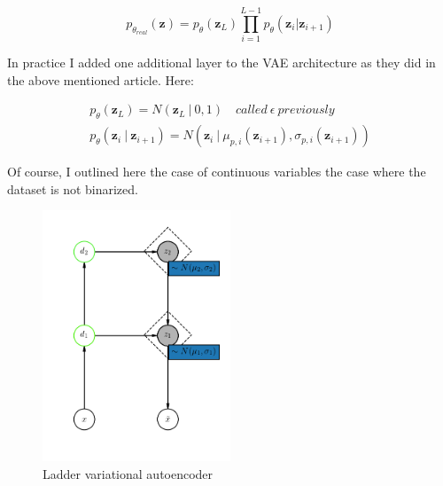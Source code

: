 \documentclass[11pt, english]{article}
\begin{document}
\vspace{3mm}

\begin{equation}
    p_{\theta_{real}}(\bm{z}) =  p_{\theta}(\bm{z}_{L})\prod_{i = 1}^{L - 1}p_{\theta}(\bm{z}_i | \bm{z}_{i+1})
\end{equation}

\vspace{3mm}

\par In practice I added one additional layer to the VAE architecture as they did in the above mentioned article. Here:

\vspace{3mm}

\begin{gather*}
    p_{\theta}(\bm{z}_L) = N(\bm{z}_L  ~ | ~ 0, 1) \quad called\ \epsilon\ previously\\
    p_{\theta}(\bm{z}_i ~ | ~ \bm{z}_{i+1}) = N(\bm{z}_i ~ |  ~ \mu_{p,i}(\bm{z}_{i+1}), \sigma_{p, i}(\bm{z}_{i+1}))
\end{gather*}

\vspace{3mm}

\par Of course, I outlined here the case of continuous variables the case where the dataset is not binarized. 

\vspace{3mm}

\begin{figure}[H]
    \centering
    \includegraphics[width=0.5\textwidth]{lvae.png}
    \caption{Ladder variational autoencoder}
\end{figure}
\end{document}
